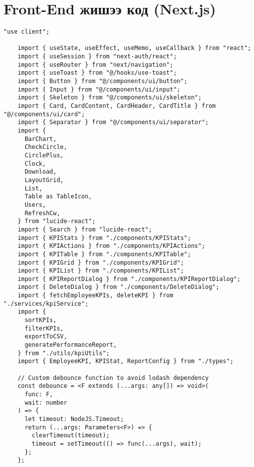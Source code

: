 \chapter{Front-End жишээ код (Next.js)}
\label{lst:api}
\begin{lstlisting}[language=Golang, caption=Routes, frame=single]
    "use client";

    import { useState, useEffect, useMemo, useCallback } from "react";
    import { useSession } from "next-auth/react";
    import { useRouter } from "next/navigation";
    import { useToast } from "@/hooks/use-toast";
    import { Button } from "@/components/ui/button";
    import { Input } from "@/components/ui/input";
    import { Skeleton } from "@/components/ui/skeleton";
    import { Card, CardContent, CardHeader, CardTitle } from "@/components/ui/card";
    import { Separator } from "@/components/ui/separator";
    import {
      BarChart,
      CheckCircle,
      CirclePlus,
      Clock,
      Download,
      LayoutGrid,
      List,
      Table as TableIcon,
      Users,
      RefreshCw,
    } from "lucide-react";
    import { Search } from "lucide-react";
    import { KPIStats } from "./components/KPIStats";
    import { KPIActions } from "./components/KPIActions";
    import { KPITable } from "./components/KPITable";
    import { KPIGrid } from "./components/KPIGrid";
    import { KPIList } from "./components/KPIList";
    import { KPIReportDialog } from "./components/KPIReportDialog";
    import { DeleteDialog } from "./components/DeleteDialog";
    import { fetchEmployeeKPIs, deleteKPI } from "./services/kpiService";
    import {
      sortKPIs,
      filterKPIs,
      exportToCSV,
      generatePerformanceReport,
    } from "./utils/kpiUtils";
    import { EmployeeKPI, KPIStat, ReportConfig } from "./types";
    
    // Custom debounce function to avoid lodash dependency
    const debounce = <F extends (...args: any[]) => void>(
      func: F,
      wait: number
    ) => {
      let timeout: NodeJS.Timeout;
      return (...args: Parameters<F>) => {
        clearTimeout(timeout);
        timeout = setTimeout(() => func(...args), wait);
      };
    };
    

\end{lstlisting}
